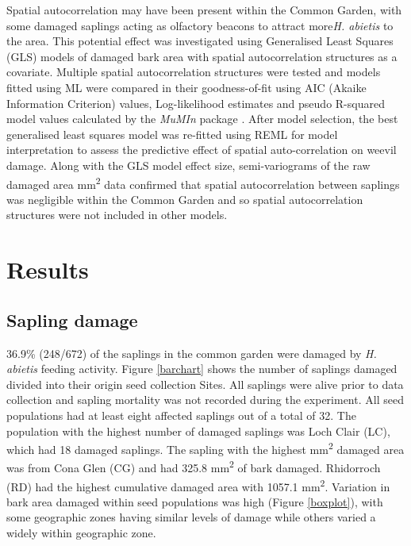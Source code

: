 \documentclass[a4paper, 11pt]{article}
\begin{document}
Spatial autocorrelation may have been present within the Common Garden, with some damaged saplings acting as olfactory beacons to attract more\textit{H. abietis} to the area. This potential effect was investigated using Generalised Least Squares (GLS) models of damaged bark area with spatial autocorrelation structures as a covariate. Multiple spatial autocorrelation structures were tested and models fitted using ML were compared in their goodness-of-fit using AIC (Akaike Information Criterion) values, Log-likelihood estimates and pseudo R-squared model values calculated by the \textit{MuMIn} package \citep{MuMIn}. After model selection, the best generalised least squares model was re-fitted using REML for model interpretation to assess the predictive effect of spatial auto-correlation on weevil damage. Along with the GLS model effect size, semi-variograms of the raw damaged area mm\textsuperscript{2} data confirmed that spatial autocorrelation between saplings was negligible within the Common Garden and so spatial autocorrelation structures were not included in other models.

\section*{Results}

\subsection*{Sapling damage}

36.9\% (248/672) of the saplings in the common garden were damaged by \textit{H. abietis} feeding activity. Figure \ref{barchart} shows the number of saplings damaged divided into their origin seed collection Sites. All saplings were alive prior to data collection and sapling mortality was not recorded during the experiment. All seed populations had at least eight affected saplings out of a total of 32. The population with the highest number of damaged saplings was Loch Clair (LC), which had 18 damaged saplings. The sapling with the highest mm\textsuperscript{2} damaged area was from Cona Glen (CG) and had 325.8 mm\textsuperscript{2} of bark damaged. Rhidorroch (RD) had the highest cumulative damaged area with 1057.1 mm\textsuperscript{2}. Variation in bark area damaged within seed populations was high (Figure \ref{boxplot}), with some geographic zones having similar levels of damage while others varied a widely within geographic zone.
\end{document}
